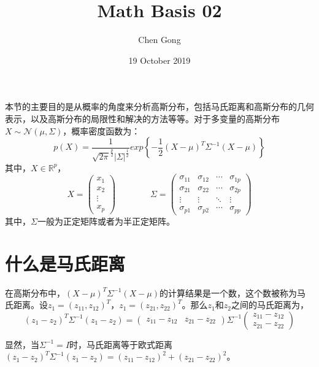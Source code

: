 \documentclass[a4paper]{article}
\title{Math Basis 02}
\author{Chen Gong}
\date{19 October 2019}
\begin{document}
\maketitle
本节的主要目的是从概率的角度来分析高斯分布，包括马氏距离和高斯分布的几何表示，以及高斯分布的局限性和解决的方法等等。对于多变量的高斯分布$X\sim \mathcal{N}(\mu,\Sigma)$，概率密度函数为：
\begin{equation}
    p(X)=\frac{1}{\sqrt{2\pi}^{\frac{p}{2}}|\Sigma|^{\frac{1}{2}}}exp\left\{ -\frac{1}{2}(X-\mu)^T\Sigma^{-1}(X-\mu) \right\}
\end{equation}
其中，$X\in\mathbb{R}^p$，
\begin{equation}
    X=
    \begin{pmatrix}
        x_1 \\
        x_2 \\
        \vdots \\
        x_p
    \end{pmatrix} \qquad \qquad
    \Sigma = 
    \begin{pmatrix}
        \sigma_{11} & \sigma_{12} & \cdots & \sigma_{1p} \\
        \sigma_{21} & \sigma_{22} & \cdots & \sigma_{2p} \\
        \vdots      & \vdots      & \ddots & \vdots      \\
        \sigma_{p1} & \sigma_{p2} & \cdots & \sigma_{pp}
        \end{pmatrix}
\end{equation}
其中，$\Sigma$一般为正定矩阵或者为半正定矩阵。

\section{什么是马氏距离}
在高斯分布中，$(X-\mu)^T\Sigma^{-1}(X-\mu)$的计算结果是一个数，这个数被称为马氏距离。设$z_1=(z_{11}, z_{12})^T$，$z_1=(z_{21}, z_{22})^T$。那么$z_1$和$z_2$之间的马氏距离为，
\begin{equation}
    (z_1-z_2)^T\Sigma^{-1}(z_1-z_2)=
    \begin{pmatrix}
        z_{11}-z_{12} & z_{21}-z_{22}
    \end{pmatrix}
    \Sigma^{-1}
    \begin{pmatrix}
        z_{11}-z_{12} \\
        z_{21}-z_{22}
    \end{pmatrix}
\end{equation}

显然，当$\Sigma^{-1}=I$时，马氏距离等于欧式距离$ (z_1-z_2)^T\Sigma^{-1}(z_1-z_2)=(z_{11}-z_{12})^2+(z_{21}-z_{22})^2$。
\end{document}
